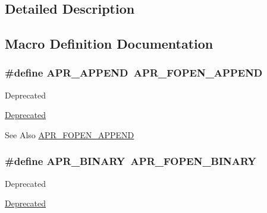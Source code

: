 \subsection{Detailed Description}


\subsection{Macro Definition Documentation}
\hypertarget{group__apr__file__open__flags_ga26d3de2bae5c90e5124869f56c141c2e}{
\subsubsection[{A\-P\-R\-\_\-\-A\-P\-P\-E\-N\-D}]{\setlength{\rightskip}{0pt plus 5cm}\#define A\-P\-R\-\_\-\-A\-P\-P\-E\-N\-D~{\bf A\-P\-R\-\_\-\-F\-O\-P\-E\-N\-\_\-\-A\-P\-P\-E\-N\-D}}}\label{group__apr__file__open__flags_ga26d3de2bae5c90e5124869f56c141c2e}
\begin{DoxyRefDesc}{Deprecated}
\item[\hyperlink{deprecated__deprecated000020}{Deprecated}]\end{DoxyRefDesc}
\begin{DoxySeeAlso}{See Also}
\hyperlink{group__apr__file__open__flags_ga45f353db9b71d4760a3f35cf3781cfc8}{A\-P\-R\-\_\-\-F\-O\-P\-E\-N\-\_\-\-A\-P\-P\-E\-N\-D} 
\end{DoxySeeAlso}
\hypertarget{group__apr__file__open__flags_ga0e7556bac0cc0d1dafdf38952a4e4015}{
\subsubsection[{A\-P\-R\-\_\-\-B\-I\-N\-A\-R\-Y}]{\setlength{\rightskip}{0pt plus 5cm}\#define A\-P\-R\-\_\-\-B\-I\-N\-A\-R\-Y~{\bf A\-P\-R\-\_\-\-F\-O\-P\-E\-N\-\_\-\-B\-I\-N\-A\-R\-Y}}}\label{group__apr__file__open__flags_ga0e7556bac0cc0d1dafdf38952a4e4015}
\begin{DoxyRefDesc}{Deprecated}
\item[\hyperlink{deprecated__deprecated000022}{Deprecated}]\end{DoxyRefDesc}
